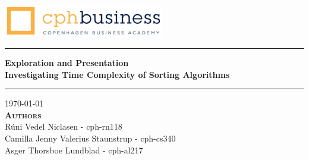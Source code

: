 
\begin{titlepage}
\begin{center}

\vspace*{4cm}
\includegraphics[width=7cm]{./figures/cphlogo.png}
\vspace*{2cm}

\hrule
\vspace{.5cm}
{ \huge \bfseries Exploration and Presentation 
\\ 
\vspace{.5cm}
Investigating Time Complexity of Sorting Algorithms} 
\vspace{.5cm}
\hrule

\vspace{1cm}
\centering \today\\
\vspace{0.5cm}
\textsc{\textbf{Authors}}\\

\centering
Rúni Vedel Niclasen - cph-rn118\\
Camilla Jenny Valerius Staunstrup - cph-cs340\\
Asger Thorsboe Lundblad - cph-al217\\

\vspace{10cm}


\end{center}
\end{titlepage}